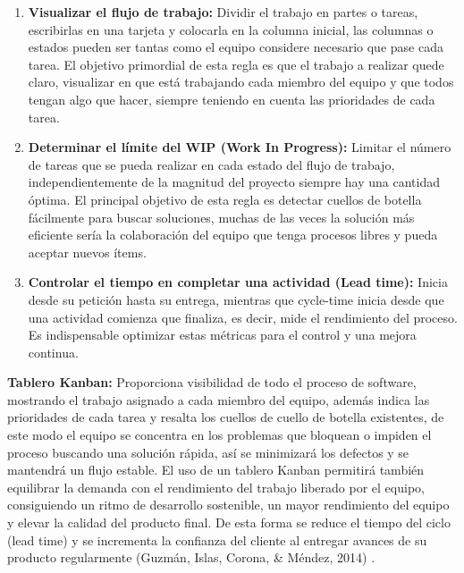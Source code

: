 \documentclass[../Main.tex]{subfiles}
\begin{document}
\begin{enumerate}
	\item \textbf{Visualizar el flujo de trabajo:} Dividir el trabajo en partes o tareas, escribirlas en una tarjeta y colocarla en la columna inicial, las columnas o estados pueden ser tantas como el equipo considere necesario que pase cada tarea. El objetivo primordial de esta regla es que el trabajo a realizar quede claro, visualizar en que está trabajando cada miembro del equipo y que todos tengan algo que hacer, siempre teniendo en cuenta las prioridades de cada tarea. \par

	\item \textbf{Determinar el límite del WIP (Work In Progress):} Limitar el número de tareas que se pueda realizar en cada estado del flujo de trabajo, independientemente de la magnitud del proyecto siempre hay una cantidad óptima. El principal objetivo de esta regla es detectar cuellos de botella fácilmente para buscar soluciones, muchas de las veces la solución más eficiente sería la colaboración del equipo que tenga procesos libres y pueda aceptar nuevos ítems.   \par

	\item \textbf{Controlar el tiempo en completar una actividad (Lead time):} Inicia desde su petición hasta su entrega, mientras que cycle-time inicia desde que una actividad comienza que finaliza, es decir, mide el rendimiento del proceso. Es indispensable optimizar estas métricas para el control y una mejora continua. 
\end{enumerate}\par

\begin{justify}
\textbf{Tablero Kanban:} Proporciona visibilidad de todo el proceso de software, mostrando el trabajo asignado a cada miembro del equipo, además indica las prioridades de cada tarea y resalta los cuellos de cuello de botella existentes, de este modo el equipo se concentra en los problemas que bloquean o impiden el proceso buscando una solución rápida, así se minimizará los defectos y se mantendrá un flujo estable. El uso de un tablero Kanban permitirá también equilibrar la demanda con el rendimiento del trabajo liberado por el equipo, consiguiendo un ritmo de desarrollo sostenible, un mayor rendimiento del equipo y elevar la calidad del producto final. De esta forma se reduce el tiempo del ciclo (lead time) y se incrementa la confianza del cliente al entregar avances de su producto regularmente (Guzmán, Islas, Corona, & Méndez, 2014) \cite{30}. 
\end{justify}\par
\end{document}
